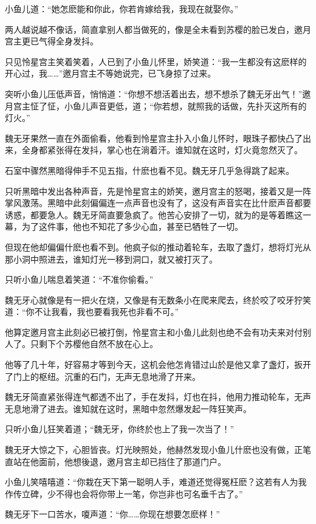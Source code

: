 \documentclass[12pt,oneside]{book}
\begin{document}
小鱼儿道：``她怎麽能和你此，你若肯嫁给我，我现在就娶你。''

两人越说越不像话，简直拿别人都当做死的，像是全未看到苏樱的脸已发白，邀月宫主更已气得全身发抖。

只见怜星宫主笑着笑着，人已到了小鱼儿怀里，娇笑道：``我一生都没有这麽样的开心过，我\ldots\ldots{}''邀月宫主不等她说完，已飞身掠了过来。

突听小鱼儿压低声音，悄悄道：``你想不想活着出去，想不想杀了魏无牙出气！''邀月宫主怔了怔，小鱼儿声音更低，道；``你若想，就照我的话做，先扑灭这所有的灯火。''

魏无牙果然一直在外面偷看，他看到怜星宫主扑入小鱼儿怀时，眼珠子都快凸了出来，全身都紧张得在发抖，掌心也在淌着汗。谁知就在这时，灯火竟忽然灭了。

石室中骤然黑暗得伸手不见五指，什麽也看不见。魏无牙几乎急得跳了起来。

只听黑暗中发出各种声音，先是怜星宫主的娇笑，邀月宫主的怒喝，接着又是一阵掌风激荡。黑暗中此刻偏偏连一点声音也没有了，这没有声音实在比什麽声音都要诱惑，都要急人。魏无牙简直要急疯了。他苦心安排了一切，就为的是等着瞧这一幕，为了这件事，他也不知花了多少心血，甚至已牺牲了一切。

但现在他却偏偏什麽也看不到。他疯子似的推动着轮车，去取了盏灯，想将灯光从那小洞中照进去，谁知灯光一移到洞口，就又被打灭了。

只听小鱼儿喘息着笑道：``不准你偷看。''

魏无牙心就像是有一把火在烧，又像是有无数条小在爬来爬去，终於咬了咬牙狞笑道：``你不让我看，我也要看我死也非看不可。''

他算定邀月宫主此刻必已被打倒，怜星宫主和小鱼儿此刻也绝不会有功夫来对付别人了。只剩下个苏樱他自然不放在心上。

他等了几十年，好容易才等到今天，这机会他怎肯错过山於是他又拿了盏灯，扳开了门上的枢纽。沉重的石门，无声无息地滑了开来。

魏无牙简直紧张得连气都透不出了，手在发抖，灯也在抖，他用力推动轮车，无声无息地滑了进去。谁知就在这时，黑暗中忽然爆发起一阵狂笑声。

只听小鱼儿狂笑着道；``魏无牙，你终於也上了我一次当了！''

魏无牙大惊之下，心胆皆丧。灯光映照处，他赫然发现小鱼儿什麽也没有做，正笔直站在他面前，他想後退，邀月宫主却已挡住了那道门户。

小鱼儿笑嘻嘻道：``你栽在天下第一聪明人手，难道还觉得冤枉麽？这若有人为我作传立碑，少不得也会将你带上一笔，你岂非也可名垂千古了。''

魏无牙下一口苦水，嗄声道：``你\ldots\ldots 你现在想要怎麽样！''
\end{document}
